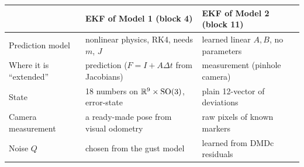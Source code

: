 \begin{center}\small
\begin{tabularx}{\linewidth}{@{}l X X@{}}
\toprule
 & \textbf{EKF of Model 1 (block 4)} & \textbf{EKF of Model 2 (block 11)}\\
\midrule
Prediction model & nonlinear physics, RK4, needs $m$, $J$ & learned linear $A,B$, no parameters\\
Where it is ``extended'' & prediction ($F=I+A\Delta t$ from Jacobians) & measurement (pinhole camera)\\
State & 18 numbers on $\mathbb{R}^9\times\mathrm{SO}(3)$, error-state & plain 12-vector of deviations\\
Camera measurement & a ready-made pose from visual odometry & raw pixels of known markers\\
Noise $Q$ & chosen from the gust model & learned from DMDc residuals\\
\bottomrule
\end{tabularx}
\end{center}

